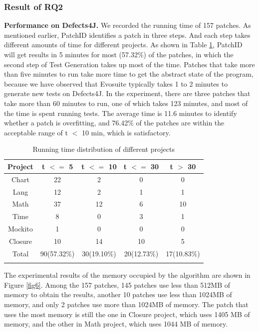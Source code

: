 \documentclass[sn-basic]{sn-jnl}
\theoremstyle{thmstyleone}
\theoremstyle{thmstyletwo}
\theoremstyle{thmstylethree}
\begin{document}
\subsubsection{Result of RQ2}
\textbf{Performance on Defects4J.} We recorded the running time of 157 patches. As mentioned earlier, PatchID identifies a patch in three steps. And each step takes different amounts of time for different projects. As shown in Table \ref{tab7}, PatchID will get results in 5 minutes for most (57.32$\%$) of the patches, in which the second step of Test Generation takes up most of the time. Patches that take more than five minutes to run take more time to get the abstract state of the program, because we have observed that Evosuite typically takes 1 to 2 minutes to generate new tests on Defects4J. In the experiment, there are three patches that take more than 60 minutes to run, one of which takes 123 minutes, and most of the time is spent running tests. The average time is 11.6 minutes to identify whether a patch is overfitting, and 76.42$\%$ of the patches are within the acceptable range of t $<$ 10 min, which is satisfactory.

\begin{table}[ht]
	\begin{center}
		\begin{minipage}{\textwidth}
			\caption{Running time distribution of different projects}\label{tab7}%
			\begin{tabular}{ccccc}
				\toprule
				Project & t $<=$ 5 & t $<=$ 10 &t $<=$ 30 &t $>$ 30\\
				\midrule
				Chart	&22	&2&	0&	0\\
				Lang&	12&	2&	1&	1\\
				Math&	37&	12&	6&	10 \\
				Time&	8&	0&	3&	1\\
				Mockito&	1&	0	&0&	0\\
				Closure&	10&	14&	10&	5\\
				Total&	90(57.32$\%$)&	30(19.10$\%$)&	20(12.73$\%$)&	17(10.83$\%$)\\
				\botrule
			\end{tabular}
		\end{minipage}
	\end{center}
\end{table}

The experimental results of the memory occupied by the algorithm are shown in Figure \ref{fig6}. Among the 157 patches, 145 patches use less than 512MB of memory to obtain the results, another 10 patches use less than 1024MB of memory, and only 2 patches use more than 1024MB of memory. The patch that uses the most memory is still the one in Closure project, which uses 1405 MB of memory, and the other in Math project, which uses 1044 MB of memory.
\end{document}
